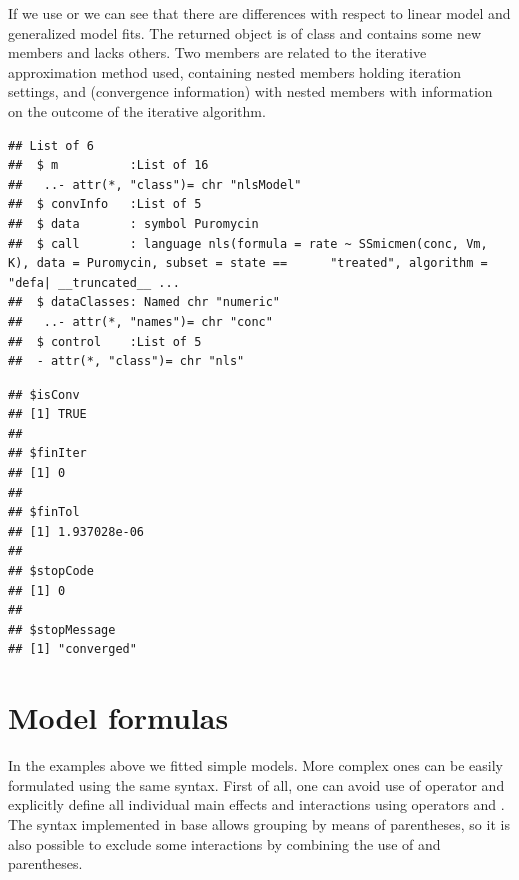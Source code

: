 \documentclass[krantz2]{krantz}\usepackage{knitr}
\begin{document}
\begin{explainbox}
If we use  or  we can see that there are differences with respect to linear model and generalized model fits. The returned object is of class  and contains some new members and lacks others. Two members are related to the iterative approximation method used,  containing nested members holding iteration settings, and  (convergence information) with nested members with information on the outcome of the iterative algorithm.

\begin{knitrout}\footnotesize
{}\color{fgcolor}\begin{kframe}
\begin{alltt}
  \hlstd{=} \hlstd{)}
\end{alltt}
\begin{verbatim}
## List of 6
##  $ m          :List of 16
##   ..- attr(*, "class")= chr "nlsModel"
##  $ convInfo   :List of 5
##  $ data       : symbol Puromycin
##  $ call       : language nls(formula = rate ~ SSmicmen(conc, Vm, K), data = Puromycin, subset = state ==      "treated", algorithm = "defa| __truncated__ ...
##  $ dataClasses: Named chr "numeric"
##   ..- attr(*, "names")= chr "conc"
##  $ control    :List of 5
##  - attr(*, "class")= chr "nls"
\end{verbatim}
\end{kframe}
\end{knitrout}

\begin{knitrout}\footnotesize
{}\color{fgcolor}\begin{kframe}
\begin{alltt}
\hlopt{$}
\end{alltt}
\begin{verbatim}
## $isConv
## [1] TRUE
## 
## $finIter
## [1] 0
## 
## $finTol
## [1] 1.937028e-06
## 
## $stopCode
## [1] 0
## 
## $stopMessage
## [1] "converged"
\end{verbatim}
\end{kframe}
\end{knitrout}
\end{explainbox}


\section{Model formulas}
In the examples above we fitted simple models. More complex ones can be easily formulated using the same syntax. First of all, one can avoid use of operator \code{*} and explicitly define all individual main effects and interactions using operators \code{+} and \code{:}. The syntax implemented in base \Rlang allows grouping by means of parentheses, so it is also possible to exclude some interactions by combining the use of \code{*} and parentheses.
\end{document}
